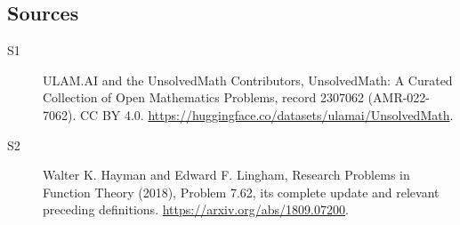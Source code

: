 \documentclass[11pt]{article}
\begin{document}
\subsection{Sources}
\begin{description}
\item[\hypertarget{source:2307062:1}{S1}] ULAM.AI and the UnsolvedMath Contributors, UnsolvedMath: A Curated Collection of Open Mathematics Problems, record 2307062 (AMR-022-7062). CC BY 4.0. \url{https://huggingface.co/datasets/ulamai/UnsolvedMath}.
\item[\hypertarget{source:2307062:2}{S2}] Walter K. Hayman and Edward F. Lingham, Research Problems in Function Theory (2018), Problem 7.62, its complete update and relevant preceding definitions. \url{https://arxiv.org/abs/1809.07200}.
\end{description}
\label{end:2307062}
\end{document}
